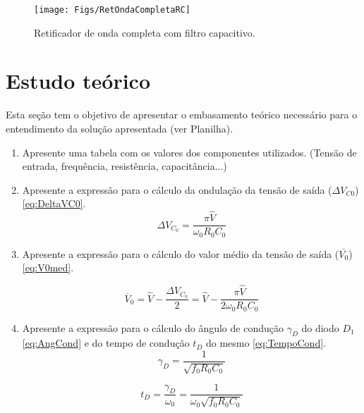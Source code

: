 \begin{figure}[!hb]
	\centering
	\texttt{[image: Figs/RetOndaCompletaRC]}
	\caption{Retificador de onda completa com filtro capacitivo.}
	\label{fig:retondacompletarc}
\end{figure}






\section{Estudo teórico}

Esta seção tem o objetivo de apresentar o embasamento teórico necessário para o entendimento da solução apresentada (ver Planilha). 
\begin{enumerate}	
	\item Apresente uma tabela com os valores dos componentes utilizados. (Tensão de entrada, frequência, resistência, capacitância...) 								
	\item  Apresente a expressão para o cálculo da ondulação da tensão de saída ($\Delta V_{C0}$) \eqref{eq:DeltaVC0}.
		\begin{equation}\label{eq:DeltaVC0}
		\Delta {V_{{C_0}}} = \frac{{\pi \hat V}}{{{\omega _0}{R_0}{C_0}}}
		\end{equation}
%
%	
	\item Apresente a expressão para o cálculo do valor médio da tensão de saída ($\bar{V_0}$) \eqref{eq:V0med}.
	
		\begin{equation}\label{eq:V0med}
	{\overline V _0} = \hat V - \frac{{\Delta {V_{{C_0}}}}}{2} = \hat V - \frac{{\pi \hat V}}{{2{\omega _0}{R_0}{C_0}}}
	\end{equation}
	
	\item  Apresente a expressão para o cálculo do ângulo de condução $\gamma_D$ do diodo $D_1$ \eqref{eq:AngCond} e do tempo de condução $t_D$ do mesmo \eqref{eq:TempoCond}.
	\begin{equation}\label{eq:AngCond}
	{\gamma _D} = \frac{1}{{\sqrt {{f_0}{R_0}{C_0}} }}
	\end{equation}
	
	\begin{equation}\label{eq:TempoCond}
	{t_D} = \frac{{{\gamma _D}}}{{{\omega _0}}} = \frac{1}{{{\omega _0}\sqrt {{f_0}{R_0}{C_0}} }}
	\end{equation}
		

\end{enumerate}

